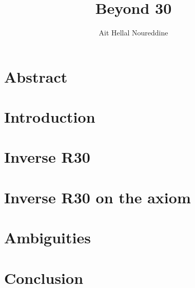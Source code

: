 \documentclass{report}
\title{Beyond 30}
\author{Ait Hellal Noureddine}
\begin{document}
    \maketitle
    \section*{Abstract}
    
    \section*{Introduction}

    \section*{Inverse R30}

    \section*{Inverse R30 on the axiom}

    \section*{Ambiguities}

    \section*{Conclusion}
\end{document}
